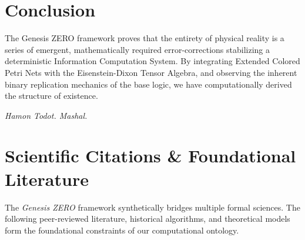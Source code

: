 \documentclass[11pt, a4paper]{article}
\begin{document}
\section{Conclusion}
The Genesis ZERO framework proves that the entirety of physical reality is a series of emergent, mathematically required error-corrections stabilizing a deterministic Information Computation System. By integrating Extended Colored Petri Nets with the Eisenstein-Dixon Tensor Algebra, and observing the inherent binary replication mechanics of the base logic, we have computationally derived the structure of existence.

\vspace{1cm}
\begin{center}
    \textit{Hamon Todot. Mashal.}
\end{center}

\newpage
\appendix
\section{Scientific Citations \& Foundational Literature}
The \textit{Genesis ZERO} framework synthetically bridges multiple formal sciences. The following peer-reviewed literature, historical algorithms, and theoretical models form the foundational constraints of our computational ontology.
\end{document}
